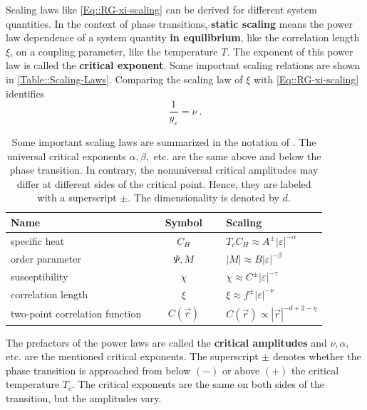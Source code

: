 	Scaling laws like \autoref{Eq::RG-xi-scaling} can be derived for different system quantities. In the context of phase transitions, \textbf{static scaling} means the power law dependence of a system quantity \textbf{in equilibrium}, like the correlation length $\xi$, on a coupling parameter, like the temperature $T$. The exponent of this power law is called the \textbf{critical exponent}. Some important scaling relations are shown in \autoref{Table::Scaling-Laws}. Comparing the scaling law of $\xi$ with \autoref{Eq::RG-xi-scaling} identifies
	\begin{equation}
		\frac{1}{y_\varepsilon} = \nu ~.
	\end{equation}
	\begin{table}[h]
		\centering
		\caption{Some important scaling laws are summarized in the notation of \cite{pelissetto2002critical}. The universal critical exponents $\alpha, \beta,$ etc. are the same above and below the phase transition. In contrary, the nonuniversal critical amplitudes may differ at different sides of the critical point. Hence, they are labeled with a superscript $\pm$. The dimensionality is denoted by $d$.}
		\begin{tabular}{l c l}
			\toprule
			Name  & $\quad$ Symbol $\quad$ & Scaling \\
			\midrule
			specific heat & $C_H$ & $T_c C_H \approx A^{\pm} |\varepsilon|^{-\alpha}$ \\
			order parameter & $\Psi, M$ & $|M| \approx B |\varepsilon|^{-\beta}$ \\
			susceptibility & $\chi$ & $\chi \approx C^{\pm} |\varepsilon|^{-\gamma}$ \\
			correlation length & $\xi$ & $\xi \approx f^{\pm} |\varepsilon|^{-\nu}$ \\
			two-point correlation function & $C(\vec{r})$& $C(\vec{r}) \propto |\vec{r}|^{- d + 2 - \eta}$ \\
			\bottomrule
		\end{tabular}
		\label{Table::Scaling-Laws}
	\end{table}
	The prefactors of the power laws are called the \textbf{critical amplitudes} and $\nu, \alpha, $ etc. are the mentioned critical exponents. The superscript $\pm$ denotes whether the phase transition is approached from below $(-)$ or above $(+)$ the critical temperature $T_c$. The critical exponents are the same on both sides of the transition, but the amplitudes vary. \\
	
